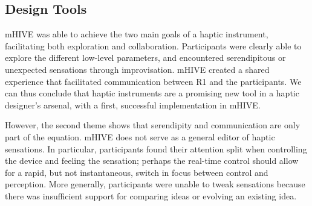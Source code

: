 %
%
\subsection{Design Tools}

mHIVE was able to achieve the two main goals of a haptic instrument, facilitating both exploration and collaboration.
Participants were clearly able to explore the different low-level parameters, and encountered serendipitous or unexpected sensations through improvisation.
mHIVE created a shared experience that facilitated communication between R1 and the participants.
We can thus conclude that haptic instruments are a promising new tool in a haptic designer's arsenal, with a first, successful implementation in mHIVE.

However, the second theme shows that serendipity and communication are only part of the equation.
mHIVE does not serve as a general editor of haptic sensations.
In particular, participants found their attention split when controlling the device and feeling the sensation; perhaps the real-time control should allow for a rapid, but not instantaneous, switch in focus between control and perception.
More generally, participants were unable to tweak sensations because there was insufficient support for comparing ideas or evolving an existing idea.

